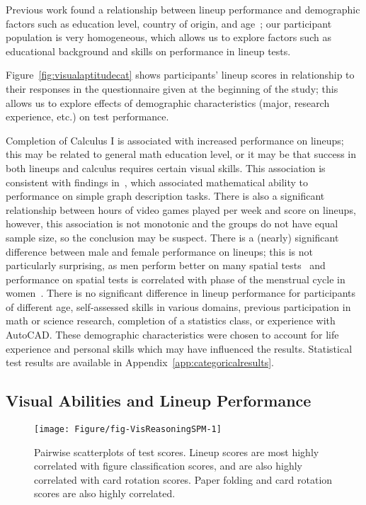 \documentclass[journal]{vgtc}\usepackage[]{graphicx}\usepackage[]{color}
\begin{document}
Previous work found a relationship between lineup performance and demographic factors such as education level, country of origin, and age~\cite{humanfactorslineups}; our participant population is very homogeneous, which allows us to explore factors such as educational background and skills on performance in lineup tests. 

Figure~\ref{fig:visualaptitudecat} shows participants' lineup scores in relationship to their responses in the questionnaire given at the beginning of the study; this allows us to explore effects of demographic characteristics (major, research experience, etc.) on test performance. 

Completion of Calculus I is associated with increased performance on lineups; this may be related to general math education level, or it may be that success in both lineups and calculus requires certain visual skills. This association is consistent with findings in~\cite{shah1995conceptual}, which associated  mathematical ability to performance on simple graph description tasks.  There is also a significant relationship between hours of video games played per week and score on lineups, however, this association is not monotonic and the groups do not have equal sample size, so the conclusion may be suspect. There is a (nearly) significant difference between male and female performance on lineups; this is not particularly surprising, as men perform better on many spatial tests~\cite{voyer1995magnitude} and performance on spatial tests is correlated with phase of the menstrual cycle in women~\cite{hausmann2000sex}. There is no significant difference in lineup performance for participants of different age, self-assessed skills in various domains, previous participation in math or science research, completion of a statistics class, or experience with AutoCAD. These demographic characteristics were chosen to account for life experience and personal skills which may have influenced the results. Statistical test results are available in Appendix~\ref{app:categoricalresults}. 

\subsection{Visual Abilities and Lineup Performance}



\begin{figure}[ht]
\centering
\texttt{[image: Figure/fig-VisReasoningSPM-1]}
\caption{Pairwise scatterplots of test scores. Lineup scores are most highly correlated with figure classification scores, and are also highly correlated with card rotation scores. Paper folding and card rotation scores are also highly correlated.\label{fig:scatterplotmatrix}}
\end{figure}
\end{document}
